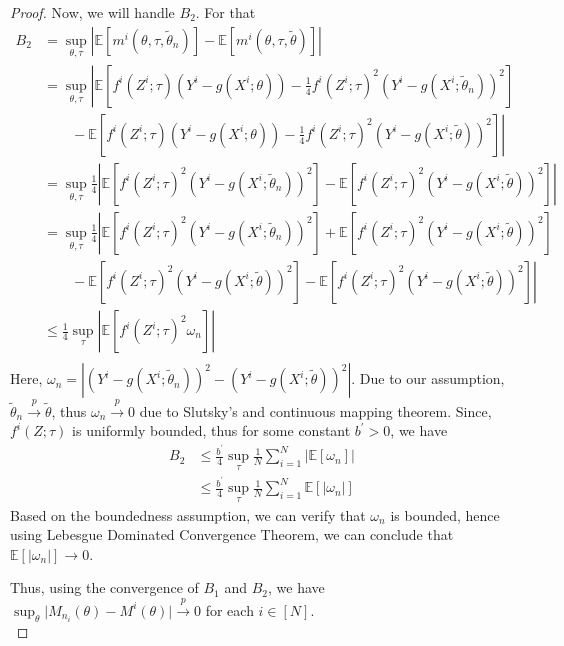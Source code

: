 \documentclass{article}
\theoremstyle{definition}
\begin{document}
\begin{proof}
    Now, we will handle $B_2$. For that
    \begin{align*}
B_2&=\sup_{\theta,\tau}\left\vert\mathbb{E}\left[m^i(\theta,\tau,\tilde{\theta}_n)\right]-\mathbb{E}\left[m^i(\theta,\tau,\tilde{\theta})\right]\right\vert\\
&=\sup_{\theta,\tau}\left\vert\mathbb{E}\left[f^i(Z^i;\tau)(Y^i-g(X^i;\theta))-\frac{1}{4}f^i(Z^i;\tau)^2(Y^i-g(X^i;\tilde{\theta}_n))^2\right]\right.\\
&\qquad-\left.\mathbb{E}\left[f^i(Z^i;\tau)(Y^i-g(X^i;\theta))-\frac{1}{4}f^i(Z^i;\tau)^2(Y^i-g(X^i;\tilde{\theta}))^2\right]\right\vert \\
&=\sup_{\theta,\tau}\frac{1}{4}\left\vert\mathbb{E}\left[f^i(Z^i;\tau)^2(Y^i-g(X^i;\tilde{\theta}_n))^2\right]-\mathbb{E}\left[f^i(Z^i;\tau)^2(Y^i-g(X^i;\tilde{\theta}))^2\right]\right\vert \\
&=\sup_{\theta,\tau}\frac{1}{4}\left\vert\mathbb{E}\left[f^i(Z^i;\tau)^2(Y^i-g(X^i;\tilde{\theta}_n))^2\right]+\mathbb{E}\left[f^i(Z^i;\tau)^2(Y^i-g(X^i;\tilde{\theta}))^2\right]\right.\\
&\qquad-\left.\mathbb{E}\left[f^i(Z^i;\tau)^2(Y^i-g(X^i;\tilde{\theta}))^2\right]-\mathbb{E}\left[f^i(Z^i;\tau)^2(Y^i-g(X^i;\tilde{\theta}))^2\right]\right\vert \\
&\leq\frac{1}{4}\sup_{\tau}\left\vert\mathbb{E}\left[f^i(Z^i;\tau)^2\omega_n\right]\right\vert \\
    \end{align*}
    Here, $\omega_n=\left|(Y^i-g(X^i;\tilde{\theta}_n))^2-(Y^i-g(X^i;\tilde{\theta}))^2\right|$. 
    Due to our assumption, $\tilde{\theta}_n\xrightarrow{p}\tilde{\theta}$, thus $\omega_n\xrightarrow{p}0$ due to Slutsky's and continuous mapping theorem.
    Since, $f^i(Z;\tau)$ is uniformly bounded, thus for some constant $b^\prime>0$, we have
    \begin{align*}
B_2 &\leq\frac{b^\prime}{4}\sup_{\tau}\frac{1}{N}\sum_{i=1}^{N}\left\vert\mathbb{E}\left[\omega_n\right]\right\vert \\
&\leq\frac{b^\prime}{4}\sup_{\tau}\frac{1}{N}\sum_{i=1}^{N}\mathbb{E}\left[\left\vert\omega_n\right\vert\right]
 \end{align*}
 Based on the boundedness assumption, we can verify that $\omega_n$ is bounded, hence using Lebesgue Dominated Convergence Theorem, we can conclude that $\mathbb{E}\left[\left\vert\omega_n\right\vert\right]\rightarrow 0.$

 Thus, using the convergence of $B_1$ and $B_2$, we have $\sup_\theta\vert M_{n_i}(\theta)-M^i(\theta)\vert\xrightarrow{p}0$ for each $i\in [N]$.\\


\end{proof}
\end{document}
